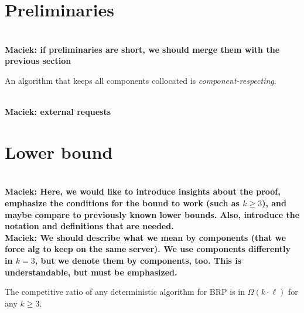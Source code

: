 \documentclass[manuscript,screen=true]{acmart}
\newcommand{\OBRP}{BRP}
\newcommand\maciek[1]{\color{brown}\textbf{\\ Maciek: #1}\color{black}}
\begin{document}
\section{Preliminaries}

\maciek{if preliminaries are short, we should merge them with the previous section}

An algorithm that  keeps all components collocated is \emph{component-respecting}.

\maciek{external requests}


\section{Lower bound} %
\label{sec:lowerbound}


\maciek{Here, we would like to introduce insights about the proof, emphasize the conditions for the bound to work (such as $k\geq 3$), and maybe compare to previously known lower bounds. Also, introduce the notation and definitions that are needed.}
\maciek{We should describe what we mean by  components (that we force alg to keep on the same server). We use components differently in $k=3$, but we denote them by components, too. This is understandable, but must be emphasized.}

\begin{theorem}
	The competitive ratio of any deterministic algorithm for \OBRP{} is in $\Omega(k\cdot \ell)$ for any $k\geq 3$.
\end{theorem}
\end{document}
